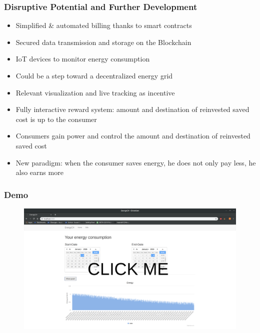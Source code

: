 \documentclass[t]{beamer}
\begin{document}
  \begin{frame}[t]
    \frametitle{Disruptive Potential and Further Development}
    \vskip-0.45cm
	\begin{itemize}
	\item{Simplified \& automated billing thanks to smart contracts}
	\item{Secured data transmission and storage on the Blockchain}
	\item{IoT devices to monitor energy consumption}
	\item{Could be a step toward a decentralized energy grid}    
	\end{itemize}
	\begin{itemize}
	\item{Relevant visualization and live tracking as incentive}
	\item{Fully interactive reward system: amount and destination of reinvested saved cost is up to the consumer}   
	\item{Consumers gain power and control the amount and destination of reinvested saved cost}
	\item{New paradigm: when the consumer saves energy, he does not only pay less, he also earns more}
	\end{itemize}
    \end{frame}

  \begin{frame}
    \frametitle{Demo}
	\begin{figure}
	\vskip-0.5cm
	    \href{https://github.com/maede97/MinusMinusEnergy/blob/master/doc/demo/fullDemo.gif}{
	\includegraphics[width=1\linewidth]{demo.png}}
	\end{figure}

  \end{frame}
\end{document}
